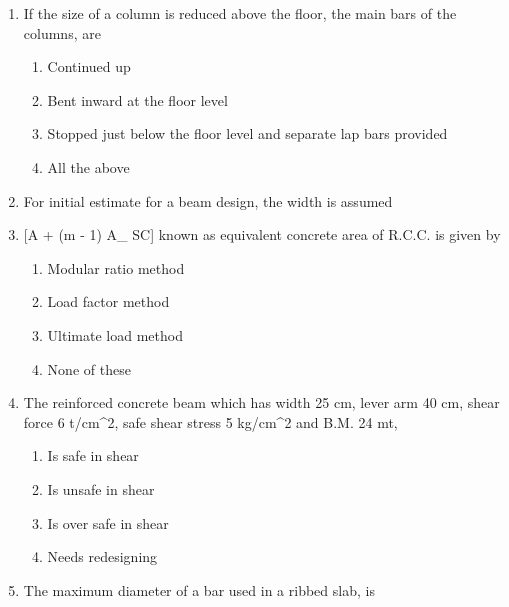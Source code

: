 \documentclass[11pt,a4paper]{article}
\begin{document}
\begin{enumerate}
\begin{enumerate*}[itemjoin=\qquad, label=\Alph*.]
\item{5 cm}
\item{10 cm}
\item{15 cm}
\item{20 cm}
\end{enumerate*}
\item{If the size of a column is reduced above the floor, the main bars of the columns, are}
\begin{enumerate}[label=\Alph*.]
\item{Continued up}
\item{Bent inward at the floor level}
\item{Stopped just below the floor level and separate lap bars provided}
\item{All the above}
\end{enumerate}
\item{For initial estimate for a beam design, the width is assumed}
\\
\item{[A + (m - 1) A\_ SC] known as equivalent concrete area of R.C.C. is given by}
\begin{enumerate}[label=\Alph*.]
\item{Modular ratio method}
\item{Load factor method}
\item{Ultimate load method}
\item{None of these}
\end{enumerate}
\item{The reinforced concrete beam which has width 25 cm, lever arm 40 cm, shear force 6
t/cm\^{}2, safe shear stress 5 kg/cm\^{}2 and B.M. 24 mt,
}
\begin{enumerate}[label=\Alph*.]
\item{Is safe in shear}
\item{Is unsafe in shear}
\item{Is over safe in shear}
\item{Needs redesigning}
\end{enumerate}
\item{The maximum diameter of a bar used in a ribbed slab, is}

\end{enumerate}
\end{document}
